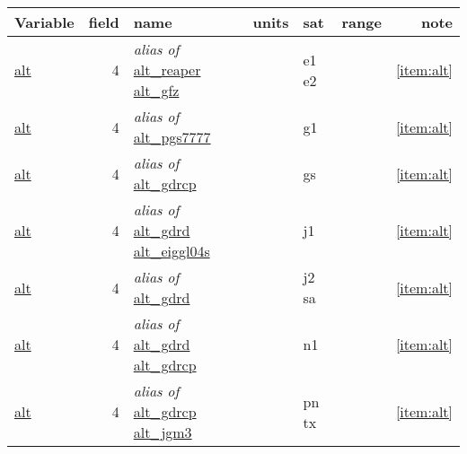 \documentclass[a4paper,11pt,openany,natbib]{thesis}
\makeatletter
\newcommand\var[1]{\url{#1}\index{variables!#1@\protect\url{#1}}}
\newcommand\alias[1]{\emph{alias of} \var{#1}}
\newenvironment{vartable}{
\begin{table}[ht]
\small
\begin{tabular}{lrllllr}
\hline
Variable & field & name & units & sat & range & note \\
\hline
}{
\hline
\end{tabular}
\end{table}
}
\makeatother
\begin{document}
\begin{vartable}
\var{alt} & 4 & \alias{alt_reaper} \var{alt_gfz} & & e1 e2 && \ref{item:alt} \\
\var{alt} & 4 & \alias{alt_pgs7777} & & g1 && \ref{item:alt} \\
\var{alt} & 4 & \alias{alt_gdrcp} & & gs && \ref{item:alt} \\
\var{alt} & 4 & \alias{alt_gdrd} \var{alt_eiggl04s} & & j1 && \ref{item:alt} \\
\var{alt} & 4 & \alias{alt_gdrd} & & j2 sa && \ref{item:alt} \\
\var{alt} & 4 & \alias{alt_gdrd} \var{alt_gdrcp} & & n1 && \ref{item:alt} \\
\var{alt} & 4 & \alias{alt_gdrcp} \var{alt_jgm3} & & pn tx && \ref{item:alt} \\
\end{vartable}
\end{document}
